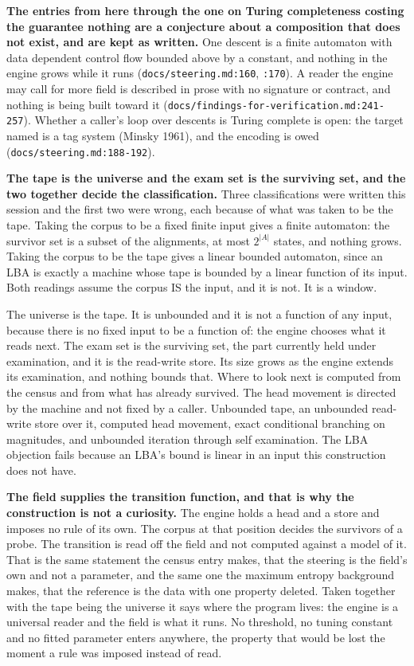 \textbf{The entries from here through the one on Turing completeness costing the guarantee nothing are a conjecture about a composition that does not exist, and are kept as written.} One descent is a finite automaton with data dependent control flow bounded above by a constant, and nothing in the engine grows while it runs (\texttt{docs/\allowbreak{}steering.md:160}, \texttt{:170}). A reader the engine may call for more field is described in prose with no signature or contract, and nothing is being built toward it (\texttt{docs/\allowbreak{}findings-\allowbreak{}for-\allowbreak{}verification.md:241-257}). Whether a caller's loop over descents is Turing complete is open: the target named is a tag system (Minsky 1961), and the encoding is owed (\texttt{docs/\allowbreak{}steering.md:188-192}).

\textbf{The tape is the universe and the exam set is the surviving set, and the two together decide the classification.} Three classifications were written this session and the first two were wrong, each because of what was taken to be the tape. Taking the corpus to be a fixed finite input gives a finite automaton: the survivor set is a subset of the alignments, at most \(2^{|A|}\) states, and nothing grows. Taking the corpus to be the tape gives a linear bounded automaton, since an LBA is exactly a machine whose tape is bounded by a linear function of its input. Both readings assume the corpus IS the input, and it is not. It is a window.

The universe is the tape. It is unbounded and it is not a function of any input, because there is no fixed input to be a function of: the engine chooses what it reads next. The exam set is the surviving set, the part currently held under examination, and it is the read-write store. Its size grows as the engine extends its examination, and nothing bounds that. Where to look next is computed from the census and from what has already survived. The head movement is directed by the machine and not fixed by a caller. Unbounded tape, an unbounded read-write store over it, computed head movement, exact conditional branching on magnitudes, and unbounded iteration through self examination. The LBA objection fails because an LBA's bound is linear in an input this construction does not have.

\textbf{The field supplies the transition function, and that is why the construction is not a curiosity.} The engine holds a head and a store and imposes no rule of its own. The corpus at that position decides the survivors of a probe. The transition is read off the field and not computed against a model of it. That is the same statement the census entry makes, that the steering is the field's own and not a parameter, and the same one the maximum entropy background makes, that the reference is the data with one property deleted. Taken together with the tape being the universe it says where the program lives: the engine is a universal reader and the field is what it runs. No threshold, no tuning constant and no fitted parameter enters anywhere, the property that would be lost the moment a rule was imposed instead of read.

